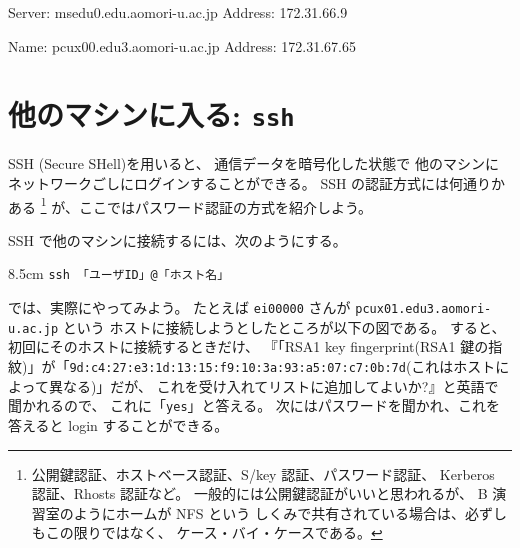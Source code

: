 \begin{progls}
Server:  msedu0.edu.aomori-u.ac.jp
Address:  172.31.66.9

Name:    pcux00.edu3.aomori-u.ac.jp
Address:  172.31.67.65
%
\end{progls}

\section{他のマシンに入る: \texttt{ssh}}

SSH (Secure SHell)を用いると、
通信データを暗号化した状態で
他のマシンにネットワークごしにログインすることができる。
SSH の認証方式には何通りかある
\footnote{公開鍵認証、ホストベース認証、S/key 認証、パスワード認証、
Kerberos 認証、Rhosts 認証など。
一般的には公開鍵認証がいいと思われるが、 B 演習室のようにホームが NFS という
しくみで共有されている場合は、必ずしもこの限りではなく、
ケース・バイ・ケースである。}
が、ここではパスワード認証の方式を紹介しよう。

SSH で他のマシンに接続するには、次のようにする。

\begin{coml}{8.5cm}
\texttt{ssh 「ユーザID」@「ホスト名」}
\end{coml}

では、実際にやってみよう。
たとえば \texttt{ei00000} さんが \texttt{pcux01.edu3.aomori-u.ac.jp} という
ホストに接続しようとしたところが以下の図である。
すると、初回にそのホストに接続するときだけ、
『「RSA1 key fingerprint(RSA1 鍵の指紋)」が「\texttt{9d:c4:27:e3:1d:13:15:f9:10:3a:93:a5:07:c7:0b:7d}(これはホストによって異なる)」だが、
これを受け入れてリストに追加してよいか?』と英語で聞かれるので、
これに「\texttt{yes}」と答える。
次にはパスワードを聞かれ、これを答えると login することができる。


